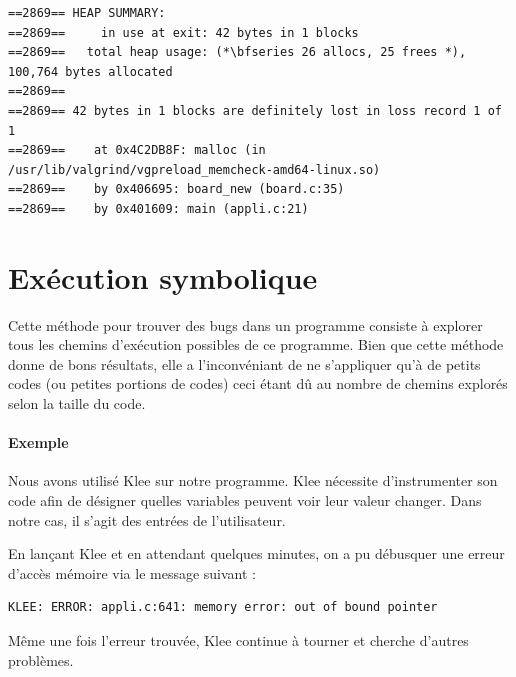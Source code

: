 \documentclass{report}
\begin{document}
\begin{scriptsize}
  \begin{lstlisting}
==2869== HEAP SUMMARY:
==2869==     in use at exit: 42 bytes in 1 blocks
==2869==   total heap usage: (*\bfseries 26 allocs, 25 frees *), 100,764 bytes allocated
==2869== 
==2869== 42 bytes in 1 blocks are definitely lost in loss record 1 of 1
==2869==    at 0x4C2DB8F: malloc (in /usr/lib/valgrind/vgpreload_memcheck-amd64-linux.so)
==2869==    by 0x406695: board_new (board.c:35)
==2869==    by 0x401609: main (appli.c:21)
  \end{lstlisting}
\end{scriptsize}

\section{Exécution symbolique}
Cette méthode pour trouver des bugs dans un programme consiste à explorer tous les chemins d'exécution possibles de ce programme. Bien que cette méthode donne de bons résultats, elle a l'inconvéniant de ne s'appliquer qu'à de petits codes (ou petites portions de codes) ceci étant dû au nombre de chemins explorés selon la taille du code. 

\paragraph{Exemple}
Nous avons utilisé Klee sur notre programme. Klee nécessite d'instrumenter son code afin de désigner quelles variables peuvent voir leur valeur changer. Dans notre cas, il s'agit des entrées de l'utilisateur.

En lançant Klee et en attendant quelques minutes, on a pu débusquer une erreur d'accès mémoire via le message suivant :
\begin{scriptsize}
  \begin{lstlisting}
KLEE: ERROR: appli.c:641: memory error: out of bound pointer
  \end{lstlisting}
\end{scriptsize}

Même une fois l'erreur trouvée, Klee continue à tourner et cherche d'autres problèmes.
\end{document}
